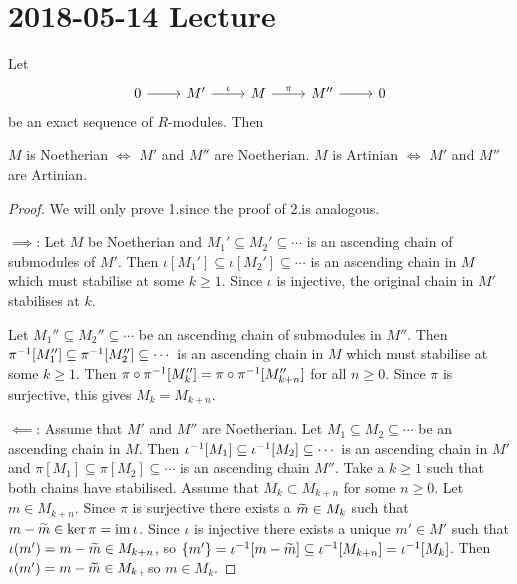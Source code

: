 \section{2018-05-14 Lecture}

\begin{prop}[3.3]
  Let
  \begin{equation*}
    \begin{tikzcd}
      0 \ar[r] & M' \ar[r,"\iota"] & M \ar[r,"\pi"]& M'' \ar[r] & 0
    \end{tikzcd}
  \end{equation*}
  be an exact sequence of $R$-modules.
  Then
  \begin{enum}
    \io $M$ is Noetherian $\iff$ $M'$ and $M''$ are Noetherian.
    \io $M$ is Artinian $\iff$ $M'$ and $M''$ are Artinian.
  \end{enum}
\end{prop}

\begin{proof}
  We will only prove 1.\@ since the proof of 2.\@ is analogous.

  $\implies$:
  Let $M$ be Noetherian and $M_1' \subseteq M_2' \subseteq \cdots$ is an ascending chain of submodules of $M'$.
  Then $\iota[M_1'] \subseteq \iota[M_2'] \subseteq \cdots$ is an ascending chain in $M$ which must stabilise at some $k \geq 1$.
  Since $\iota$ is injective, the original chain in $M'$ stabilises at $k$.

  Let $M_1'' \subseteq M_2'' \subseteq \cdots$ be an ascending chain of submodules in $M''$.
  Then $\pi^{-1}[M_1''] \subseteq \pi^{-1}[M_2''] \subseteq \cdots$ is an ascending chain in $M$ which must stabilise at some $k \geq 1$.
  Then $\pi\circ\pi^{-1}[M_k'']=\pi\circ\pi^{-1}[M_{k+n}'']$ for all $n \geq 0$.
  Since $\pi$ is surjective, this gives $M_k=M_{k+n}$.


  $\impliedby$:
  Assume that $M'$ and $M''$ are Noetherian.
  Let $M_1 \subseteq M_2 \subseteq \cdots$ be an ascending chain in $M$.
  Then $\iota^{-1}[M_1] \subseteq \iota^{-1}[M_2] \subseteq \cdots$ is an ascending chain in $M'$ and $\pi[M_1] \subseteq \pi[M_2] \subseteq \cdots$ is an ascending chain $M''$.
  Take a $k \geq 1$ such that both chains have stabilised.
  Assume that $M_k \subset M_{k+n}$ for some $n \geq 0$.
  Let $m \in M_{k+n}$.
  Since $\pi$ is surjective there exists a $\widetilde m \in M_k$ such that $m-\widetilde m \in \ker\pi = \operatorname{im}\iota$.
  Since $\iota$ is injective there exists a unique $m' \in M'$ such that $\iota(m') = m - \widetilde m \in M_{k+n}$, so $\{m'\} = \iota^{-1}[m-\widetilde m] \subseteq \iota^{-1}[M_{k+n}] = \iota^{-1}[M_k]$.
  Then $\iota(m') = m - \widetilde m \in M_k$, so $m \in M_k$.
\end{proof}


